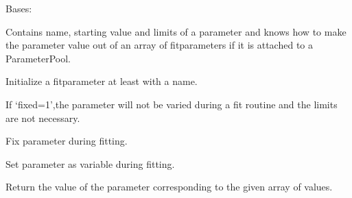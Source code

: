 \documentclass[letterpaper,10pt,english]{sphinxmanual}
\begin{document}
\begin{fulllineitems}
\label{\detokenize{modules-api/parameters:Parameters.Fitparameter}}
Bases: {\hyperref[\detokenize{modules-api/parameters:Parameters.Parameter}]{}}

Contains name, starting value and limits of a parameter and knows how to make the parameter value out of an array of fitparameters if it is attached to a ParameterPool.

\begin{fulllineitems}
\label{\detokenize{modules-api/parameters:Parameters.Fitparameter.__init__}}
Initialize a fitparameter at least with a name.

If ‘fixed=1’,the parameter will not be varied during a fit routine and the limits are not necessary.

\end{fulllineitems}


\begin{fulllineitems}
\label{\detokenize{modules-api/parameters:Parameters.Fitparameter.fix}}
Fix parameter during fitting.

\end{fulllineitems}


\begin{fulllineitems}
\label{\detokenize{modules-api/parameters:Parameters.Fitparameter.unfix}}
Set parameter as variable during fitting.

\end{fulllineitems}


\begin{fulllineitems}
\label{\detokenize{modules-api/parameters:Parameters.Fitparameter.getValue}}
Return the value of the parameter corresponding to the given array of values.


\end{fulllineitems}
\end{fulllineitems}
\end{document}
